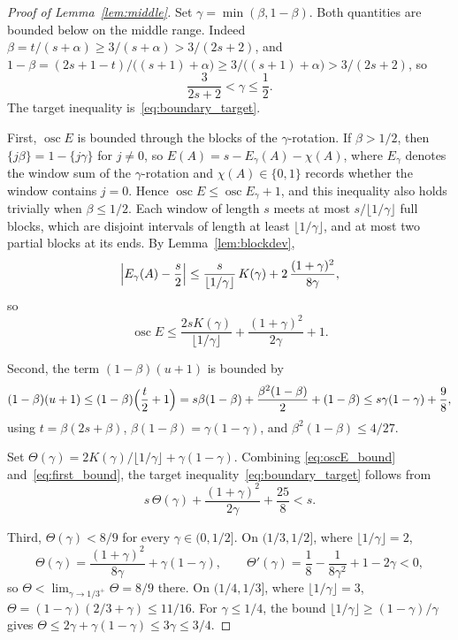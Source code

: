 \documentclass{birkjour}
\theoremstyle{definition}
\theoremstyle{remark}
\newcommand{\fl}[1]{\lfloor #1 \rfloor}
\newcommand{\frc}[1]{\{ #1 \}}
\begin{document}
\begin{proof}[Proof of Lemma~\ref{lem:middle}]
Set $\gamma=\min(\beta,1-\beta)$. Both quantities are
bounded below on the middle range. Indeed
$\beta=t/(s+\alpha)\ge 3/(s+\alpha)>3/(2s+2)$, and
$1-\beta=(2s+1-t)/\bigl((s+1)+\alpha\bigr)
\ge 3/\bigl((s+1)+\alpha\bigr)>3/(2s+2)$, so
\begin{equation}\label{eq:gamma_lb}
  \frac{3}{2s+2}<\gamma\le\frac{1}{2}.
\end{equation}
The target inequality is~\eqref{eq:boundary_target}.

First, $\operatorname{osc}E$ is bounded through the blocks
of the $\gamma$-rotation. If $\beta>1/2$, then
$\frc{j\beta}=1-\frc{j\gamma}$ for $j\neq 0$, so
$E(A)=s-E_{\gamma}(A)-\chi(A)$, where $E_{\gamma}$
denotes the window sum of the $\gamma$-rotation and
$\chi(A)\in\{0,1\}$ records whether the window
contains $j=0$. Hence
$\operatorname{osc}E\le\operatorname{osc}E_{\gamma}+1$,
and this inequality also holds trivially when
$\beta\le 1/2$. Each window of length $s$ meets at most
$s/\fl{1/\gamma}$ full blocks, which are disjoint
intervals of length at least $\fl{1/\gamma}$, and at most
two partial blocks at its ends. By
Lemma~\ref{lem:blockdev},
\[
  \Bigl|E_{\gamma}(A)-\frac{s}{2}\Bigr|
  \le\frac{s}{\fl{1/\gamma}}\,K(\gamma)
  +2\,\frac{(1+\gamma)^{2}}{8\gamma},
\]
so
\begin{equation}\label{eq:oscE_bound}
  \operatorname{osc}E
  \le\frac{2sK(\gamma)}{\fl{1/\gamma}}
  +\frac{(1+\gamma)^{2}}{2\gamma}+1.
\end{equation}

Second, the term $(1-\beta)(u+1)$ is bounded by
\begin{equation}\label{eq:first_bound}
  (1-\beta)(u+1)
  \le(1-\beta)\Bigl(\frac{t}{2}+1\Bigr)
  =s\beta(1-\beta)+\frac{\beta^{2}(1-\beta)}{2}
  +(1-\beta)
  \le s\gamma(1-\gamma)+\frac{9}{8},
\end{equation}
using $t=\beta(2s+\beta)$,
$\beta(1-\beta)=\gamma(1-\gamma)$, and
$\beta^{2}(1-\beta)\le 4/27$.

Set $\Theta(\gamma)=2K(\gamma)/\fl{1/\gamma}
+\gamma(1-\gamma)$.
Combining \eqref{eq:oscE_bound}
and~\eqref{eq:first_bound}, the target
inequality~\eqref{eq:boundary_target} follows from
\begin{equation}\label{eq:final_middle}
  s\,\Theta(\gamma)+\frac{(1+\gamma)^{2}}{2\gamma}
  +\frac{25}{8}<s.
\end{equation}

Third, $\Theta(\gamma)<8/9$ for every
$\gamma\in(0,1/2]$. On $(1/3,1/2]$, where
$\fl{1/\gamma}=2$,
\[
  \Theta(\gamma)
  =\frac{(1+\gamma)^{2}}{8\gamma}+\gamma(1-\gamma),
  \qquad
  \Theta'(\gamma)
  =\frac{1}{8}-\frac{1}{8\gamma^{2}}+1-2\gamma<0,
\]
so $\Theta<\lim_{\gamma\to 1/3^{+}}\Theta=8/9$ there. On
$(1/4,1/3]$, where $\fl{1/\gamma}=3$,
$\Theta=(1-\gamma)(2/3+\gamma)\le 11/16$. For
$\gamma\le 1/4$, the bound
$\fl{1/\gamma}\ge(1-\gamma)/\gamma$ gives
$\Theta\le 2\gamma+\gamma(1-\gamma)\le 3\gamma\le 3/4$.


\end{proof}
\end{document}
